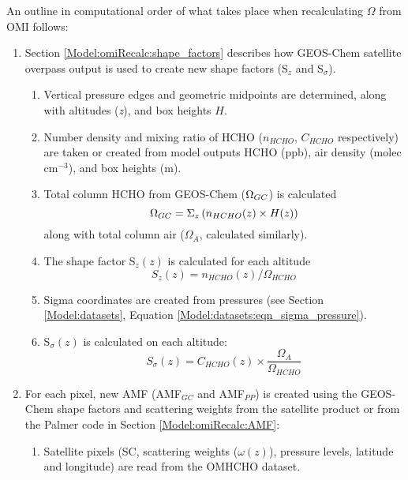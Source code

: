     An outline in computational order of what takes place when recalculating $\Omega$ from OMI follows:
    \begin{enumerate}
      \item Section \ref{Model:omiRecalc:shape_factors} describes how GEOS-Chem satellite overpass output %
        is used to create new shape factors (S$_z$ and S$_\sigma$).
      \begin{enumerate}
        \item Vertical pressure edges and geometric midpoints are determined, along with altitudes (\textit{z}), and box heights $H$.
        \item Number density and mixing ratio of HCHO ($n_{HCHO}$, $C_{HCHO}$ respectively) are taken or created from model outputs HCHO (ppb), air density (molec cm$^{-3}$), and box heights (m).
        \item Total column HCHO from GEOS-Chem ($\Omega_{GC}$) is calculated 
        \begin{equation*}
          \Omega_{GC} = \Sigma_z \left(n_{HCHO}(z) \times H(z) \right)
        \end{equation*}
        along with total column air ($\Omega_{A}$, calculated similarly).
        \item The shape factor S$_z(z)$ is calculated for each altitude 
        \begin{equation*}
          S_z(z) = n_{HCHO}(z) / \Omega_{HCHO}
        \end{equation*}
        \item Sigma coordinates are created from pressures (see Section \ref{Model:datasets}, Equation \ref{Model:datasets:eqn_sigma_pressure}).
        \item S$_\sigma(z)$ is calculated on each altitude: 
        \begin{equation*}
          S_\sigma(z) = C_{HCHO}(z) \times \frac{\Omega_A}{\Omega_{HCHO}}
        \end{equation*}
      \end{enumerate}
      \item For each pixel, new AMF (AMF$_{GC}$ and AMF$_{PP}$) is created using the GEOS-Chem shape factors and scattering weights from the satellite product or from the Palmer code in Section \ref{Model:omiRecalc:AMF}:
      \begin{enumerate}
        \item Satellite pixels (SC, scattering weights ($\omega(z)$), pressure levels, latitude and longitude) are read from the OMHCHO dataset.

\end{enumerate}
\end{enumerate}
